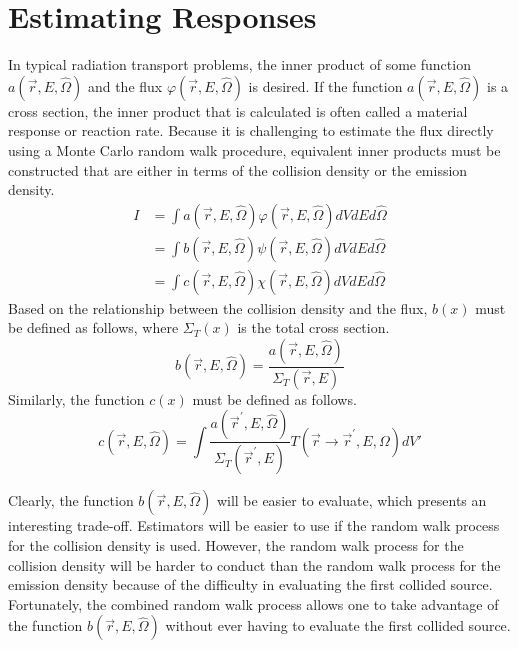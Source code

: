 \section{Estimating Responses}
In typical radiation transport problems, the inner product of some 
function $a(\vec{r},E,\hat{\Omega})$ and the flux 
$\varphi(\vec{r},E,\hat{\Omega})$ is desired. If the function 
$a(\vec{r},E,\hat{\Omega})$ is a cross section, the inner product that is 
calculated is often called a material response or reaction rate. Because it is 
challenging to estimate the flux directly using a Monte Carlo random walk 
procedure, equivalent inner products must be constructed that are either in 
terms of the collision density or the emission density. 
\begin{align}
  I & = \int a(\vec{r},E,\hat{\Omega}) \varphi(\vec{r},E,\hat{\Omega}) 
  dVdEd\hat{\Omega} \\
  & = \int b(\vec{r},E,\hat{\Omega}) \psi(\vec{r},E,\hat{\Omega})  
  dVdEd\hat{\Omega} \\
  & = \int c(\vec{r},E,\hat{\Omega}) \chi(\vec{r},E,\hat{\Omega}) 
  dVdEd\hat{\Omega}
\end{align}
Based on the relationship between the collision density and the flux, $b(x)$
must be defined as follows, where $\Sigma_T(x)$ is the total cross section.
\begin{equation}
  b(\vec{r},E,\hat{\Omega}) = \frac{a(\vec{r},E,\hat{\Omega})}
  {\Sigma_T(\vec{r},E)}
  \label{eq:collision_response_function}
\end{equation}
Similarly, the function $c(x)$ must be defined as follows.
\begin{equation}
  c(\vec{r},E,\hat{\Omega}) = \int \frac{a(\vec{r}^{'},E,\hat{\Omega})}
  {\Sigma_T(\vec{r}^{'},E)} T(\vec{r} \to \vec{r}^{'},E,\Omega)dV'
  \label{eq:emission_response_function}
\end{equation}

Clearly, the function $b(\vec{r},E,\hat{\Omega})$ will be easier to evaluate, 
which presents an interesting trade-off. Estimators will be easier to use if 
the random walk process for the collision density is used. However, the random 
walk process for the collision density will be harder to conduct than the 
random walk process for the emission density because of the difficulty in 
evaluating the first collided source. Fortunately, the combined random walk 
process allows one to take advantage of the function 
$b(\vec{r},E,\hat{\Omega})$ without ever having to evaluate the first collided 
source. 

